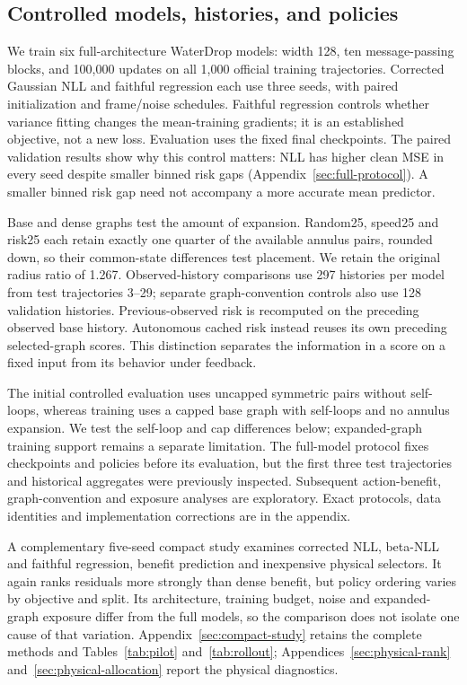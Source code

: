 \subsection{Controlled models, histories, and policies}
We train six full-architecture WaterDrop models: width 128, ten message-passing blocks, and 100,000 updates on all 1,000 official training trajectories. Corrected Gaussian NLL and faithful regression each use three seeds, with paired initialization and frame/noise schedules. Faithful regression controls whether variance fitting changes the mean-training gradients; it is an established objective, not a new loss. Evaluation uses the fixed final checkpoints. The paired validation results show why this control matters: NLL has higher clean MSE in every seed despite smaller binned risk gaps (Appendix~\ref{sec:full-protocol}). A smaller binned risk gap need not accompany a more accurate mean predictor.

Base and dense graphs test the amount of expansion. Random25, speed25 and risk25 each retain exactly one quarter of the available annulus pairs, rounded down, so their common-state differences test placement. We retain the original radius ratio of 1.267. Observed-history comparisons use 297 histories per model from test trajectories 3--29; separate graph-convention controls also use 128 validation histories. Previous-observed risk is recomputed on the preceding observed base history. Autonomous cached risk instead reuses its own preceding selected-graph scores. This distinction separates the information in a score on a fixed input from its behavior under feedback.

The initial controlled evaluation uses uncapped symmetric pairs without self-loops, whereas training uses a capped base graph with self-loops and no annulus expansion. We test the self-loop and cap differences below; expanded-graph training support remains a separate limitation. The full-model protocol fixes checkpoints and policies before its evaluation, but the first three test trajectories and historical aggregates were previously inspected. Subsequent action-benefit, graph-convention and exposure analyses are exploratory. Exact protocols, data identities and implementation corrections are in the appendix.

A complementary five-seed compact study examines corrected NLL, beta-NLL and faithful regression, benefit prediction and inexpensive physical selectors. It again ranks residuals more strongly than dense benefit, but policy ordering varies by objective and split. Its architecture, training budget, noise and expanded-graph exposure differ from the full models, so the comparison does not isolate one cause of that variation. Appendix~\ref{sec:compact-study} retains the complete methods and Tables~\ref{tab:pilot} and~\ref{tab:rollout}; Appendices~\ref{sec:physical-rank} and~\ref{sec:physical-allocation} report the physical diagnostics.

